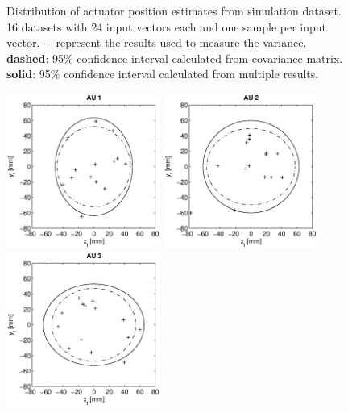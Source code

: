 \begin{figure}[hbtp]
\caption{Distribution of actuator position estimates from simulation dataset. 16 datasets with 24 input vectors each and one sample per input vector.
$\mathbf{+}$ represent the results used to measure the variance.
\textbf{dashed}: 95\% confidence interval calculated from covariance matrix.
\textbf{solid}: 95\% confidence interval calculated from multiple results. }
\label{fig:result_95pc_confidence_all}
\end{figure}

\begin{figure}[hbtp]
\captionsetup{width=0.9\textwidth}
\centering
\includegraphics[width = 0.45\textwidth]{images/results/real_confidence_95_interval_AU1.eps}
\includegraphics[width = 0.45\textwidth]{images/results/real_confidence_95_interval_AU2.eps} \\
\includegraphics[width = 0.45\textwidth]{images/results/real_confidence_95_interval_AU3.eps}

\end{figure}
